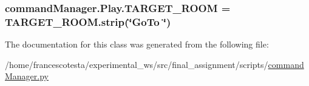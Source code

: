 \subsubsection[{\texorpdfstring{T\+A\+R\+G\+E\+T\+\_\+\+R\+O\+OM}{TARGET_ROOM}}]{\setlength{\rightskip}{0pt plus 5cm}command\+Manager.\+Play.\+T\+A\+R\+G\+E\+T\+\_\+\+R\+O\+OM = T\+A\+R\+G\+E\+T\+\_\+\+R\+O\+O\+M.\+strip(\char`\"{}Go\+To \char`\"{})\hspace{0.3cm}{\ttfamily [static]}}\hypertarget{classcommandManager_1_1Play_a4279053c8c702e0fcbc425efcd2b207c}{}\label{classcommandManager_1_1Play_a4279053c8c702e0fcbc425efcd2b207c}


The documentation for this class was generated from the following file\+:\begin{DoxyCompactItemize}
\item 
/home/francescotesta/experimental\+\_\+ws/src/final\+\_\+assignment/scripts/\hyperlink{commandManager_8py}{command\+Manager.\+py}\end{DoxyCompactItemize}
